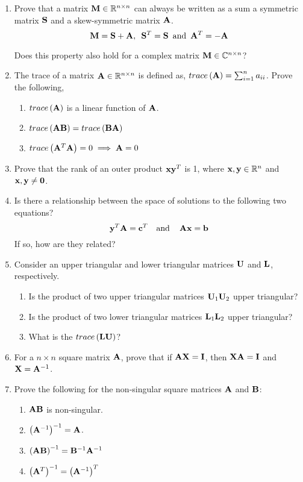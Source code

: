 \documentclass[12pt]{article}
\def\mf{\ensuremath\mathbf}
\def\mb{\ensuremath\mathbb}
\def\lp{\ensuremath\left(}
\def\rp{\ensuremath\right)}
\newcommand{\ct}[1]{\lp #1\rp}
\begin{document}
\begin{enumerate}
\item Prove that a matrix $\mf{M} \in \mathbb{R}^{n \times n}$ can always be written as a sum a symmetric matrix $\mf{S}$ and a skew-symmetric matrix $\mf{A}$.
\[ \mf{M} = \mf{S} + \mf{A}, \,\,\, \mf{S}^T = \mf{S} \, \text{ and } \, \mf{A}^T = -\mf{A} \]

Does this property also hold for a complex matrix $\mf{M} \in \mb{C}^{n \times n}$?
\item The trace of a matrix $\mf{A} \in \mb{R}^{n \times n}$ is defined as, $trace\left(\mf{A}\right) = \sum_{i=1}^{n}a_{ii}$. Prove the following,
\begin{enumerate}
    \item $trace\left(\mf{A}\right)$ is a linear function of $\mf{A}$.
    \item $trace\left(\mf{AB}\right) = trace\left(\mf{BA}\right)$
    \item $trace\left(\mf{A}^T\mf{A}\right) = 0 \implies \mf{A} = 0$
\end{enumerate}

\item Prove that the rank of an outer product $\mf{x}\mf{y}^T$ is 1, where $\mf{x},\mf{y} \in \mb{R}^n$ and $\mf{x}, \mf{y} \neq \mf{0}$.

\item Is there a relationship between the space of solutions to the following two equations? 
\[ \mf{y}^T\mf{A} = \mf{c}^T \,\,\,\, \text{ and } \,\,\,\,\, \mf{A}\mf{x} = \mf{b} \]
If so, how are they related?

\item Consider an upper triangular and lower triangular matrices $\mf{U}$ and $\mf{L}$, respectively. 
\begin{enumerate}
    \item Is the product of two upper triangular matrices $\mf{U}_1\mf{U}_2$ upper triangular?
    \item Is the product of two lower triangular matrices $\mf{L}_1\mf{L}_2$ upper triangular?
    \item What is the $trace\lp \mf{L}\mf{U} \rp$?
\end{enumerate}

\item For a $n \times n$ square matrix $\mf{A}$, prove that if $\mf{A}\mf{X} = \mf{I}$, then $\mf{X}\mf{A} = \mf{I}$ and $\mf{X} = \mf{A}^{-1}$.

\item Prove the following for the non-singular square matrices $\mf{A}$ and $\mf{B}$:
\begin{enumerate}
    \item $\mf{A}\mf{B}$ is non-singular.
    \item $\ct{\mf{A}^{-1}}^{-1} = \mf{A}$.
    \item $\ct{\mf{A}\mf{B}}^{-1} = \mf{B}^{-1}\mf{A}^{-1}$
    \item $\ct{\mf{A}^T}^{-1} = \ct{\mf{A}^{-1}}^T$
\end{enumerate}


\end{enumerate}
\end{document}
